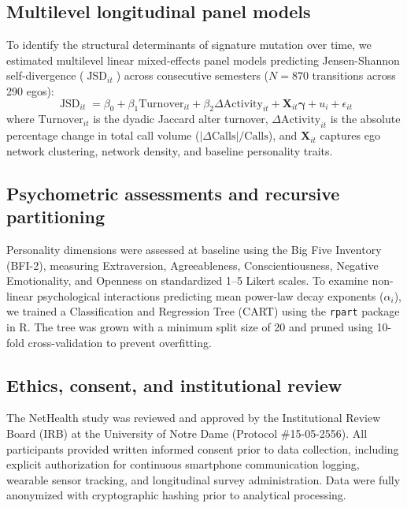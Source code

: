 \documentclass[11pt,letterpaper]{article}
\newcommand{\JSD}{\operatorname{JSD}}
\newcommand{\Turnover}{\mathrm{Turnover}}
\begin{document}
\subsection*{Multilevel longitudinal panel models}
To identify the structural determinants of signature mutation over time, we estimated multilevel linear mixed-effects panel models predicting Jensen-Shannon self-divergence ($\JSD_{it}$) across consecutive semesters ($N = 870$ transitions across 290 egos):
\begin{equation}
\JSD_{it} = \beta_0 + \beta_1 \Turnover_{it} + \beta_2 \Delta \mathrm{Activity}_{it} + \mathbf{X}_{it}\boldsymbol{\gamma} + u_i + \epsilon_{it}
\end{equation}
where $\Turnover_{it}$ is the dyadic Jaccard alter turnover, $\Delta \mathrm{Activity}_{it}$ is the absolute percentage change in total call volume ($|\Delta\mathrm{Calls}|/\mathrm{Calls}$), and $\mathbf{X}_{it}$ captures ego network clustering, network density, and baseline personality traits.

\subsection*{Psychometric assessments and recursive partitioning}
Personality dimensions were assessed at baseline using the Big Five Inventory (BFI-2), measuring Extraversion, Agreeableness, Conscientiousness, Negative Emotionality, and Openness on standardized 1--5 Likert scales. To examine non-linear psychological interactions predicting mean power-law decay exponents ($\alpha_i$), we trained a Classification and Regression Tree (CART)\cite{breiman1984classification} using the \texttt{rpart} package in \textsf{R}. The tree was grown with a minimum split size of 20 and pruned using 10-fold cross-validation to prevent overfitting.

\subsection*{Ethics, consent, and institutional review}
The NetHealth study was reviewed and approved by the Institutional Review Board (IRB) at the University of Notre Dame (Protocol \#15-05-2556). All participants provided written informed consent prior to data collection, including explicit authorization for continuous smartphone communication logging, wearable sensor tracking, and longitudinal survey administration. Data were fully anonymized with cryptographic hashing prior to analytical processing.
\end{document}
